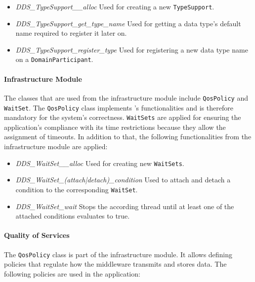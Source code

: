 \begin{itemize}
\item \textit{DDS\_TypeSupport\_\_alloc} Used for creating a new \texttt{TypeSupport}.
\item \textit{DDS\_TypeSupport\_get\_type\_name} Used for getting a data type's default name required to register it later on.
\item \textit{DDS\_TypeSupport\_register\_type} Used for registering a new data type name on a \texttt{DomainParticipant}.
\end{itemize}

\paragraph{Infrastructure Module}
The classes that are used from the infrastructure module include \texttt{QosPolicy} and \texttt{WaitSet}.
The \texttt{QosPolicy} class implements 's  functionalities and is therefore mandatory for the system's correctness.
\texttt{WaitSets} are applied for ensuring the application's compliance with its time restrictions because they allow the assignment of timeouts.
In addition to that, the following functionalities from the infrastructure module are applied:

\begin{itemize}
\item \textit{DDS\_WaitSet\_\_alloc} Used for creating new \texttt{WaitSets}.
\item \textit{DDS\_WaitSet\_(attach|detach)\_condition} Used to attach and detach a condition to the corresponding \texttt{WaitSet}.
\item \textit{DDS\_WaitSet\_wait} Stops the according thread until at least one of the attached conditions evaluates to true.
\end{itemize}

\paragraph{Quality of Services}
The \texttt{QosPolicy} class is part of the infrastructure module.
It allows defining  policies that regulate how the middleware transmits and stores data.
The following  policies are used in the application:


